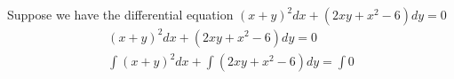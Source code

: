 \documentclass{article}
\begin{document}
Suppose we have the differential equation $(x + y)^2dx + (2xy + x^2 - 6)dy = 0$
\begin{equation}
    \begin{aligned}
    (x + y)^2dx + (2xy + x^2 - 6)dy = 0\\
    \int(x + y)^2dx + \int(2xy + x^2 - 6)dy = \int0\\
\end{aligned}
\end{equation}
\end{document}
